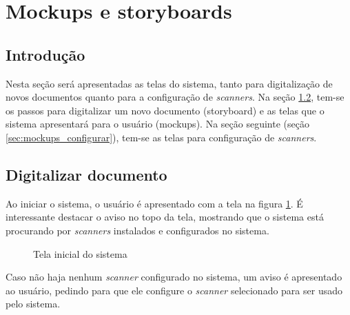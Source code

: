 \section{Mockups e storyboards}
\label{sec:mockups}

\subsection{Introdução}
\label{sec:mockups_intro}
Nesta seção será apresentadas as telas do sistema, tanto para digitalização de novos documentos quanto para a configuração de {\it scanners}. Na seção \ref{sec:mockups_digitalizar}, tem-se os passos para digitalizar um novo documento (storyboard) e as telas que o sistema apresentará para o usuário (mockups). Na seção seguinte (seção \ref{sec:mockups_configurar}), tem-se as telas para configuração de {\it scanners}.

\subsection{Digitalizar documento}
\label{sec:mockups_digitalizar}

Ao iniciar o sistema, o usuário é apresentado com a tela na figura \ref{fig:dig_1}. É interessante destacar o aviso no topo da tela, mostrando que o sistema está procurando por {\it scanners} instalados e configurados no sistema.

\begin{figure}[h]
 \centering
    \setlength\fboxsep{0pt}
    \setlength\fboxrule{0.5pt}
  \caption {Tela inicial do sistema}
  \label{fig:dig_1}
\end{figure}

Caso não haja nenhum {\it scanner} configurado no sistema, um aviso é apresentado ao usuário, pedindo para que ele configure o {\it scanner} selecionado para ser usado pelo sistema.

